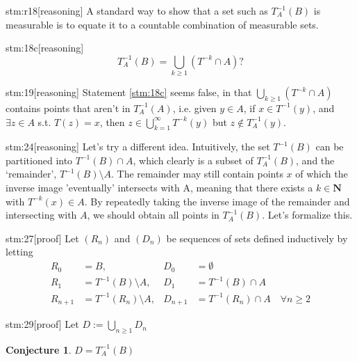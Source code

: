 \documentclass{article}
\newtheorem{conj}{Conjecture}
\begin{document}
\begin{stm}{stm:r18}[reasoning]
A standard way to show that a set such as $T_A^{-1}(B)$ is measurable is to equate it to a countable combination of measurable sets.
\end{stm}

\begin{stm}{stm:18c}[reasoning]
\[
T_A^{-1}(B) = \bigcup_{k \geq 1} (T^{-k} \cap A)?
\]
\end{stm}

\begin{stm}{stm:19}[reasoning]
Statement \ref{stm:18c} seems false, in that $\bigcup_{k \geq 1}(T^{-k} \cap A)$ contains points that aren't in $T_A^{-1}(A)$, i.e. given $y \in A$, if $x \in T^{-1}(y)$, and $\exists z \in A$ s.t. $T(z) = x$, then $z \in \bigcup_{k=1}^{\infty} T^{-k}(y)$ but $z \notin T_A^{-1}(y)$.
\end{stm}

\begin{stm}{stm:24}[reasoning]
Let's try a different idea. Intuitively, the set $T^{-1}(B)$ can be partitioned into $T^{-1}(B) \cap A$, which clearly is a subset of $T_A^{-1}(B)$, and the ‘remainder’, $T^{-1}(B) \setminus A$. The remainder may still contain points $x$ of which the inverse image 'eventually' intersects with A, meaning that there exists a $k \in \mathbf{N}$ with $T^{-k}(x) \in A$.  By repeatedly taking the inverse image of the remainder and intersecting with $A$, we should obtain all points in $T_A^{-1}(B)$. Let's formalize this.
\end{stm}

\begin{stm}{stm:27}[proof]
Let $(R_n)$ and $(D_n)$ be sequences of sets defined inductively by letting
\begin{align*}
R_0 &= B, & D_0 &= \emptyset \\
R_1 &= T^{-1}(B) \setminus A, & D_1 &= T^{-1}(B) \cap A \\
R_{n+1} &= T^{-1}(R_n) \setminus A, & D_{n+1} &= T^{-1}(R_n) \cap A \quad \forall n \ge 2
\end{align*}
\end{stm}

\begin{stm}{stm:29}[proof]
Let $D := \bigcup_{n \ge 1} D_n$
\end{stm}

\begin{conj}\label{conj:28}
$D = T_A^{-1}(B)$
\end{conj}
\end{document}
